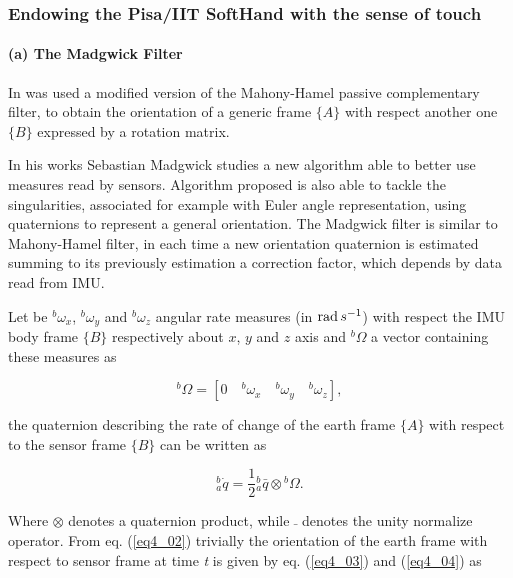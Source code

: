 
\subsubsection{Endowing the Pisa/IIT SoftHand with the sense of touch}
\label{sec:SenseOfTouch}


\paragraph{(a) The Madgwick Filter}



In \cite{Santaera:ICRA:2015} was used a modified version of the Mahony-Hamel passive complementary filter, to obtain the orientation of a generic frame $\{ A \}$ with respect another one $\{ B \}$ expressed by a rotation matrix.  

In his works Sebastian Madgwick \cite{MadgwickMARG} studies a new algorithm able to better use measures read by sensors. Algorithm proposed is also able to tackle the singularities, associated for example with Euler angle representation, using quaternions to represent a general orientation. The Madgwick filter is similar to Mahony-Hamel filter, in each time a new orientation quaternion is estimated summing to its previously estimation a correction factor, which depends by
data read from IMU.

Let be ${^b\omega_x}$, ${^b\omega_y}$ and ${^b\omega_z}$ angular rate measures (in $\operatorname{rad} s^{-1}$) with respect the IMU body frame $\{ B\}$ respectively about $x$, $y$ and $z$ axis and $^{b}\Omega$ a vector containing these measures as

\begin{equation}
\label{eq4_01}
^b \Omega = [ 0 \quad {^b\omega_x} \quad {^b\omega_y} \quad {^b\omega_z} ],
\end{equation}

\noindent the quaternion describing the rate of change of the earth frame $\{ A \}$ with respect to the sensor frame $\{ B \}$ can be written as

\begin{equation}
\label{eq4_02}
^b_a\dot{q} = \frac{1}{2} {^b_a \bar{q}}  \otimes {^b\Omega}.
\end{equation}

\noindent Where $\otimes$ denotes a quaternion product, while $\bar{}$ denotes the unity normalize operator. From eq. (\ref{eq4_02}) trivially the orientation of the earth frame with respect to sensor frame at time \textit{t} is given by eq. (\ref{eq4_03}) and (\ref{eq4_04}) as

